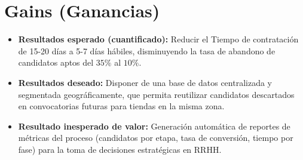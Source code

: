 \section{Gains (Ganancias)}
\begin{itemize}
  \item \textbf{Resultados esperado (cuantificado):} Reducir el Tiempo de contratación de 15-20 días a 5-7 días hábiles, 
  disminuyendo la tasa de abandono de candidatos aptos del $35\%$ al $10\%$.
  \item \textbf{Resultados deseado:} Disponer de una base de datos centralizada y segmentada geográficamente, 
  que permita reutilizar candidatos descartados en convocatorias futuras para tiendas en la misma zona.
  \item \textbf{Resultado inesperado de valor:} Generación automática de reportes de métricas del proceso
   (candidatos por etapa, tasa de conversión, tiempo por fase) para la toma de decisiones estratégicas en RRHH.
\end{itemize}
